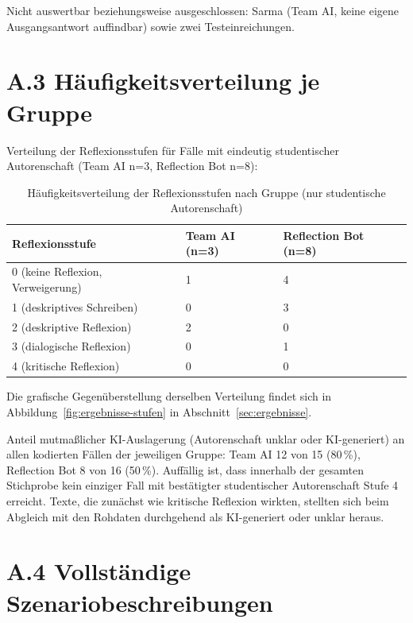 Nicht auswertbar beziehungsweise ausgeschlossen: Sarma (Team AI, keine eigene Ausgangsantwort
auffindbar) sowie zwei Testeinreichungen.

\section*{A.3 Häufigkeitsverteilung je Gruppe}
\label{app:haeufigkeiten}

Verteilung der Reflexionsstufen für Fälle mit eindeutig studentischer Autorenschaft (Team AI n=3,
Reflection Bot n=8):

\begin{table}[htbp]
	\centering
	\caption{Häufigkeitsverteilung der Reflexionsstufen nach Gruppe (nur studentische Autorenschaft)}
	\label{tab:haeufigkeiten-anhang}
	\begin{tabular}{p{6.5cm} p{3.5cm} p{3.5cm}}
		\toprule
		\textbf{Reflexionsstufe} & \textbf{Team AI (n=3)} & \textbf{Reflection Bot (n=8)} \\
		\midrule
		0 (keine Reflexion, Verweigerung) & 1 & 4 \\
		1 (deskriptives Schreiben) & 0 & 3 \\
		2 (deskriptive Reflexion) & 2 & 0 \\
		3 (dialogische Reflexion) & 0 & 1 \\
		4 (kritische Reflexion) & 0 & 0 \\
		\bottomrule
	\end{tabular}
\end{table}

Die grafische Gegenüberstellung derselben Verteilung findet sich in
Abbildung~\ref{fig:ergebnisse-stufen} in Abschnitt~\ref{sec:ergebnisse}.

Anteil mutmaßlicher KI-Auslagerung (Autorenschaft \glqq unklar\grqq{} oder \glqq KI-generiert\grqq{})
an allen kodierten Fällen der jeweiligen Gruppe: Team AI 12 von 15 (80\,\%), Reflection Bot 8 von 16
(50\,\%). Auffällig ist, dass innerhalb der gesamten Stichprobe kein einziger Fall mit
bestätigter studentischer Autorenschaft Stufe 4 erreicht. Texte, die zunächst wie kritische
Reflexion wirkten, stellten sich beim Abgleich mit den Rohdaten durchgehend als KI-generiert oder
unklar heraus.

\section*{A.4 Vollständige Szenariobeschreibungen}
\label{app:szenarien}

